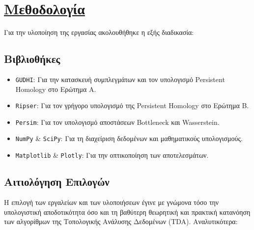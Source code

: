 \documentclass[12pt]{article}
\newcommand{\en}[1]{\foreignlanguage{english}{#1}}
\begin{document}
\newpage
\section{\texorpdfstring{\underline{Μεθοδολογία}}{Μεθοδολογία}}
\vspace{1em}

Για την υλοποίηση της εργασίας ακολουθήθηκε η εξής διαδικασία:

\subsection{Βιβλιοθήκες}
\vspace{1em}

\begin{itemize}
    \item \foreignlanguage{english}{\texttt{GUDHI}}: Για την κατασκευή συμπλεγμάτων και τον υπολογισμό \foreignlanguage{english}{Persistent Homology} στο Ερώτημα Α.
    \item \foreignlanguage{english}{\texttt{Ripser}}: Για τον γρήγορο υπολογισμό της \foreignlanguage{english}{Persistent Homology} στο Ερώτημα Β.
    \item \foreignlanguage{english}{\texttt{Persim}}: Για τον υπολογισμό αποστάσεων \foreignlanguage{english}{Bottleneck} και \foreignlanguage{english}{Wasserstein}.
    \item \foreignlanguage{english}{\texttt{NumPy}} \& \foreignlanguage{english}{\texttt{SciPy}}: Για τη διαχείριση δεδομένων και μαθηματικούς υπολογισμούς.
    \item \foreignlanguage{english}{\texttt{Matplotlib}} \& \foreignlanguage{english}{\texttt{Plotly}}: Για την οπτικοποίηση των αποτελεσμάτων.
\end{itemize}

\subsection{Αιτιολόγηση Επιλογών}
\vspace{1em}

Η επιλογή των εργαλείων και των υλοποιήσεων έγινε με γνώμονα τόσο την υπολογιστική αποδοτικότητα όσο και τη βαθύτερη θεωρητική και πρακτική κατανόηση των αλγορίθμων της Τοπολογικής Ανάλυσης Δεδομένων (\en{TDA}). Αναλυτικότερα:
\end{document}
